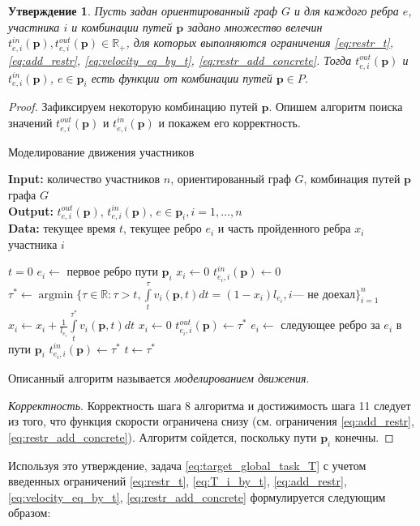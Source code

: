 \documentclass[12pt, a4paper]{article}
\DeclareMathOperator*{\argmin}{argmin}
\newtheorem{state}{Утверждение}[section]
\begin{document}
\begin{state}
\label{state:modeling}
Пусть задан ориентированный граф $G$ и для каждого ребра $e$, участника $i$ и комбинации путей $\textbf{p}$ задано множество велечин $t_{e, i}^{in}(\textbf{p}), t_{e, i}^{out}(\textbf{p}) \in \mathbb{R}_+$, для которых выполняются ограничения \eqref{eq:restr_t}, \eqref{eq:add_restr}, \eqref{eq:velocity_eq_by_t}, \eqref{eq:restr_add_concrete}. Тогда $t_{e, i}^{out}(\textbf{p})$ и $t_{e, i}^{in}(\textbf{p})$, $e \in \textbf{p}_i$ есть функции от комбинации путей $\textbf{p} \in P$.
\end{state}
\begin{proof}
Зафиксируем некоторую комбинацию путей $\textbf{p}$. Опишем алгоритм поиска значений $t_{e, i}^{out}(\textbf{p})$ и $t_{e, i}^{in}(\textbf{p})$ и покажем его корректность.

\begin{algorithm}
	\caption{Моделирование движения участников}
	\label{alg:modeling}
	{\bf {Input:}} количество участников $n$, ориентированный граф $G$, комбинация путей $\textbf{p}$ графа $G$\\
	{\bf {Output:}} $t_{e, i}^{out}(\textbf{p})$, $t_{e, i}^{in}(\textbf{p})$, $e \in \textbf{p}_i, i = 1, \ldots, n$\\
	{\bf {Data:}} текущее время $t$, текущее ребро $e_i$ и часть пройденного ребра $x_i$ участника $i$
	\begin{algorithmic}[1]
		\State $t = 0$
		\State $e_i \gets$ { первое ребро пути $\textbf{p}_i$}
		\State $x_i \gets 0$
		\State $t_{e_i, i}^{in}(\textbf{p}) \gets 0$ 
		\EndFor
		\State $\tau^* \gets \argmin\{ \tau \in \mathbb{R}: \tau > t, \int\limits_{t}^{\tau} v_i(\textbf{p}, t) dt = (1 - x_i) l_{e_i}, i \text{--- не доехал}  \}_{i = 1}^n$
		\State $x_i \gets x_i + \frac{1}{l_{e_i}} \int\limits_{t}^{\tau^*} v_i(\textbf{p}, t) dt$
				\State $x_i \gets 0$
				\State $t_{e_i, i}^{out}(\textbf{p}) \gets \tau^*$ 
				\State $e_i \gets$ следующее ребро за $e_i$ в пути $\textbf{p}_i$
				\State $t_{e_i, i}^{in}(\textbf{p}) \gets \tau^*$ 
			\EndIf
		\EndFor
		\State $t \gets \tau^*$
		\EndWhile
	\end{algorithmic}
\end{algorithm}

Описанный алгоритм называется \textit{моделированием движения}.

\textit{Корректность}. Корректность шага 8 алгоритма и достижимость шага 11 следует из того, что функция скорости ограничена снизу (см. ограничения \eqref{eq:add_restr}, \eqref{eq:restr_add_concrete}). Алгоритм сойдется, поскольку пути $\textbf{p}_i$ конечны.

\end{proof}
 Используя это утверждение, задача \eqref{eq:target_global_task_T} с учетом введенных ограничений \eqref{eq:restr_t}, \eqref{eq:T_i_by_t}, \eqref{eq:add_restr}, \eqref{eq:velocity_eq_by_t}, \eqref{eq:restr_add_concrete} формулируется следующим образом:
\end{document}
